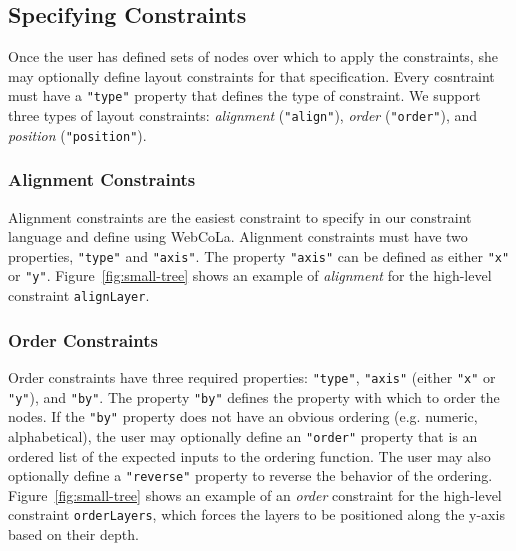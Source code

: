 \subsection{Specifying Constraints}
Once the user has defined sets of nodes over which to apply the constraints, she may optionally define layout constraints for that specification. Every cosntraint must have a \texttt{"type"} property that defines the type of constraint. We support three types of layout constraints: \emph{alignment} (\texttt{"align"}), \emph{order} (\texttt{"order"}), and \emph{position} (\texttt{"position"}).

\subsubsection{Alignment Constraints}
Alignment constraints are the easiest constraint to specify in our constraint language and define using WebCoLa. Alignment constraints must have two properties, \texttt{"type"} and \texttt{"axis"}. The property \texttt{"axis"} can be defined as either \texttt{"x"} or \texttt{"y"}. Figure~\ref{fig:small-tree} shows an example of \emph{alignment} for the high-level constraint \texttt{alignLayer}.

\subsubsection{Order Constraints}
Order constraints have three required properties: \texttt{"type"}, \texttt{"axis"} (either \texttt{"x"} or \texttt{"y"}), and \texttt{"by"}. The property \texttt{"by"} defines the property with which to order the nodes. If the \texttt{"by"} property does not have an obvious ordering (e.g. numeric, alphabetical), the user may optionally define an \texttt{"order"} property that is an ordered list of the expected inputs to the ordering function. The user may also optionally define a \texttt{"reverse"} property to reverse the behavior of the ordering. Figure~\ref{fig:small-tree} shows an example of an \emph{order} constraint for the high-level constraint \texttt{orderLayers}, which forces the layers to be positioned along the y-axis based on their depth.


